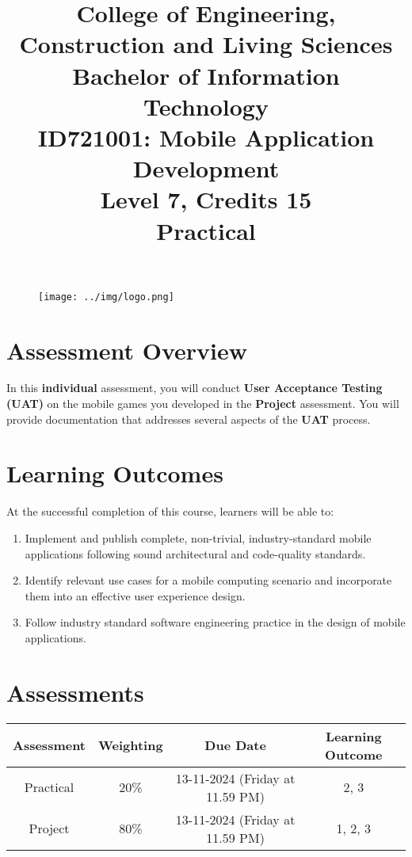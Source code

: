 \documentclass{article}
\author{}
\begin{document}
 

\begin{figure}
	\centering
	\texttt{[image: ../img/logo.png]}
\end{figure} 

\title{College of Engineering, Construction and Living Sciences\\Bachelor of Information Technology\\ID721001: Mobile Application Development\\Level 7, Credits 15\\\textbf{Practical}}
\date{}
\maketitle

\section*{Assessment Overview}
In this \textbf{individual} assessment, you will conduct \textbf{User Acceptance Testing (UAT)} on the mobile games you developed in the \textbf{Project} assessment. You will provide documentation that addresses several aspects of the \textbf{UAT} process. 

\section*{Learning Outcomes}
At the successful completion of this course, learners will be able to:
\begin{enumerate}
	\item Implement and publish complete, non-trivial, industry-standard mobile applications following sound architectural and code-quality standards.
	\item Identify relevant use cases for a mobile computing scenario and incorporate them into an effective user experience design.
	\item Follow industry standard software engineering practice in the design of mobile applications.
\end{enumerate}

\section*{Assessments}
\renewcommand{\arraystretch}{1.5}
\begin{tabular}{|c|c|c|c|}
	\hline
	\textbf{Assessment}                                 & \textbf{Weighting} & \textbf{Due Date}            & \textbf{Learning Outcome} \\ \hline
	\small Practical & \small 20\%        & \small 13-11-2024 (Friday at 11.59 PM)   & \small 2, 3                   \\ \hline
	\small Project                 & \small 80\%        & \small 13-11-2024 (Friday at 11.59 PM) \small  & \small 1, 2, 3                   \\ \hline
\end{tabular}
\end{document}
